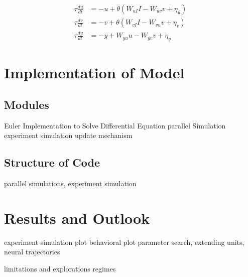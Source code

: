 \documentclass[9pt]{article}
\begin{document}
\begin{align} \label{circuit}
	\tau\frac{du}{dt} & = -u + \theta(W_{uI}I - W_{uv}v + \eta_u) \\
	\tau\frac{dv}{dt} & = -v + \theta(W_{vI}I - W_{vu}v + \eta_v) \\
	\tau\frac{dy}{dt} & = -y + W_{yu}u - W_{yv}v + \eta_y
\end{align}

\section{Implementation of Model}
\subsection{Modules}
Euler Implementation to Solve Differential Equation
parallel Simulation
experiment simulation
update mechanism

\subsection{Structure of Code}
parallel simulations, experiment simulation

\section{Results and Outlook}
experiment simulation plot
behavioral plot
parameter search, extending units, neural trajectories

limitations and explorations regimes 
\end{document}
